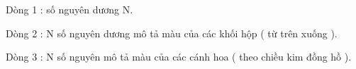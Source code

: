 Dòng 1 : số nguyên dương N.   


   Dòng 2 : N số nguyên dương mô tả màu của các khối hộp ( từ   trên xuống ).   


   Dòng 3 : N số nguyên mô tả màu của các cánh hoa ( theo chiều   kim đồng hồ ).